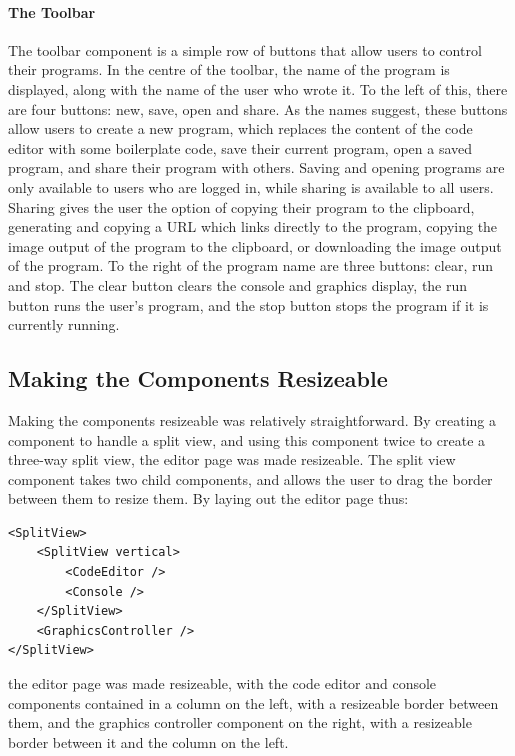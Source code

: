 \documentclass[../main.tex]{subfiles}
\begin{document}
                \paragraph{The Toolbar}
                    The toolbar component is a simple row of buttons that allow users to control
                        their programs.
                    In the centre of the toolbar, the name of the program is displayed, along with
                        the name of the user who wrote it.
                    To the left of this, there are four buttons: new, save, open and share.
                    As the names suggest, these buttons allow users to create a new program, which
                        replaces the content of the code editor with some boilerplate code, save their
                        current program, open a saved program, and share their program with others.
                    Saving and opening programs are only available to users who are logged in,
                        while sharing is available to all users.
                    Sharing gives the user the option of copying their program to the clipboard,
                        generating and copying a URL which links directly to the program, copying the
                        image output of the program to the clipboard, or downloading the image output
                        of the program.
                    To the right of the program name are three buttons: clear, run and stop.
                    The clear button clears the console and graphics display, the run button runs
                        the user's program, and the stop button stops the program if it is currently
                        running.

        \subsection{Making the Components Resizeable}
            Making the components resizeable was relatively straightforward.
            By creating a component to handle a split view, and using this component twice
                to create a three-way split view, the editor page was made resizeable.
            The split view component takes two child components, and allows the user to
                drag the border between them to resize them.
            By laying out the editor page thus: \begin{lstlisting}[caption={A simplified version of the editor page layout.},
                label={lst:editorLayout}]
<SplitView>
    <SplitView vertical>
        <CodeEditor />
        <Console />
    </SplitView>
    <GraphicsController />
</SplitView>\end{lstlisting} the editor page was
                made resizeable, with the code editor and console components contained in a
                column on the left, with a resizeable border between them, and the graphics
                controller component on the right, with a resizeable border between it and the
                column on the left.
\end{document}

